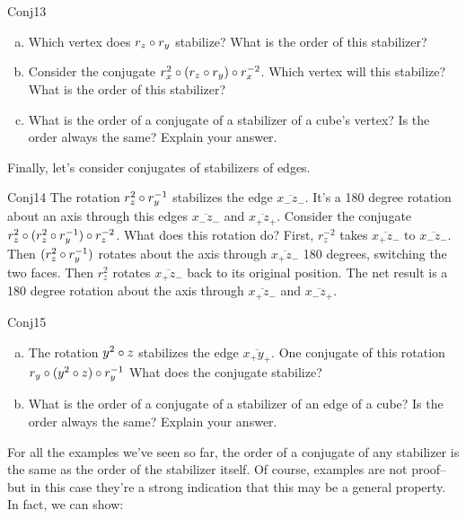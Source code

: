 \begin{exercise}{Conj13}
\begin{enumerate}[(a)]
\item Which vertex does $r_z\circ r_y$ stabilize?  What is the order of this stabilizer?  
\item Consider the conjugate $r_x^{2}\circ (r_z\circ r_y)\circ r_x^{-2}$.  Which vertex will this stabilize?  What is the order of this stabilizer?
\item What is the order of a conjugate of a stabilizer of a  cube's vertex?  Is the order always the same?  Explain your answer.
\end {enumerate}
\end {exercise}

Finally, let's consider  conjugates of stabilizers of edges.

\begin{example}{Conj14}
The rotation $r_z^2\circ r_y^{-1}$ stabilizes the edge $\overline{x_- z_-}$.  It's a 180 degree rotation about an axis through this edges  $\overline{x_- z_-}$ and $\overline{x_+z_+}$. Consider the conjugate   $r_z^{2}\circ (r_z^2\circ r_y^{-1})\circ r_z^{-2}$.  What does this rotation do?  First,  $r_z^{-2}$ takes $\overline{x_+z_-}$ to $\overline{x_-z_-}$.  Then $(r_z^2\circ r_y^{-1})$ rotates about the axis through $\overline{x_+z_-}$ 180 degrees, switching the two faces. Then $r_z^2$ rotates $\overline{x_+z_-}$ back to its original position.  The net result is a 180 degree rotation about the axis through $\overline{x_+z_-}$ and $\overline{x_-z_+}$.
\end{example}

\begin{exercise}{Conj15}
\begin{enumerate}[(a)]
\item The rotation $y^2\circ z$ stabilizes the edge $\overline{x_+y_+}$. One conjugate of this rotation $r_y\circ (y^2\circ z)\circ r_y^{-1}$ What does the conjugate stabilize?
\item What is the order of a conjugate of a stabilizer of an edge of a cube? Is the  order always the same?  Explain your answer.
\end {enumerate}
\end{exercise}

For all the examples we've seen so far, the order of a conjugate of any stabilizer is the same as the order of the stabilizer itself. Of course, examples are not proof--but in this case they're a strong indication that this may be a general property. In fact, we can show: 


